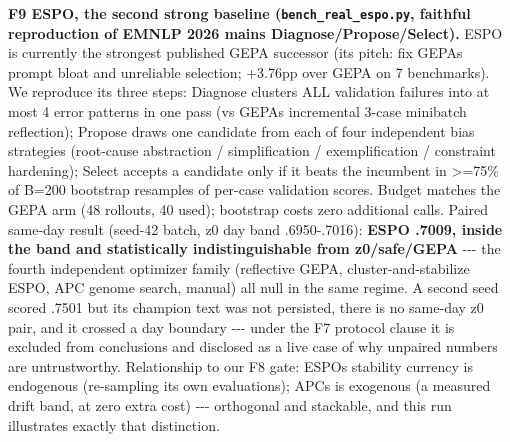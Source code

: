 \textbf{F9 ESPO, the second strong baseline (\texttt{bench\_real\_espo.py}, faithful reproduction of EMNLP 2026 main\textquotesingle s Diagnose/Propose/Select).} ESPO is currently the strongest published GEPA successor (its pitch: fix GEPA\textquotesingle s prompt bloat and unreliable selection; +3.76pp over GEPA on 7 benchmarks). We reproduce its three steps: Diagnose clusters ALL validation failures into at most 4 error patterns in one pass (vs GEPA\textquotesingle s incremental 3-case minibatch reflection); Propose draws one candidate from each of four independent bias strategies (root-cause abstraction / simplification / exemplification / constraint hardening); Select accepts a candidate only if it beats the incumbent in \textgreater=75\% of B=200 bootstrap resamples of per-case validation scores. Budget matches the GEPA arm (48 rollouts, 40 used); bootstrap costs zero additional calls. Paired same-day result (seed-42 batch, z0 day band .6950-.7016): \textbf{ESPO .7009, inside the band and statistically indistinguishable from z0/safe/GEPA} -\/-\/- the fourth independent optimizer family (reflective GEPA, cluster-and-stabilize ESPO, APC genome search, manual) all null in the same regime. A second seed scored .7501 but its champion text was not persisted, there is no same-day z0 pair, and it crossed a day boundary -\/-\/- under the F7 protocol clause it is excluded from conclusions and disclosed as a live case of why unpaired numbers are untrustworthy. Relationship to our F8 gate: ESPO\textquotesingle s stability currency is endogenous (re-sampling its own evaluations); APC\textquotesingle s is exogenous (a measured drift band, at zero extra cost) -\/-\/- orthogonal and stackable, and this run illustrates exactly that distinction.

